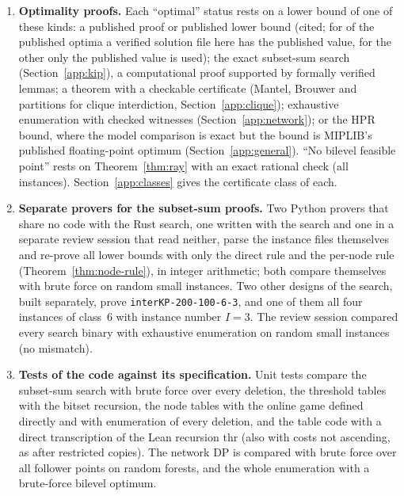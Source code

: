 \begin{enumerate}
\item \textbf{Optimality proofs.} Each ``optimal'' status rests on a lower
bound of one of these kinds: a published proof or published lower bound
(cited; for \NumLitWithFile{} of the \NumLitOptimal{} published optima a verified
solution file here has the published value, for the other \NumLitNoFile{} only
the published value is used); the exact subset-sum search
(Section~\ref{app:kip}), a computational proof supported by formally verified
lemmas; a theorem with a checkable certificate (Mantel, Brouwer and partitions
for clique interdiction, Section~\ref{app:clique}); exhaustive enumeration
with checked witnesses (Section~\ref{app:network}); or the HPR bound, where
the model comparison is exact but the bound is MIPLIB's published
floating-point optimum (Section~\ref{app:general}). ``No bilevel feasible
point'' rests on Theorem~\ref{thm:ray} with an exact rational check
(all \NumRayExact{} instances). Section~\ref{app:classes} gives the certificate
class of each.

\item \textbf{Separate provers for the subset-sum proofs.} Two Python
provers that share no code with the Rust search, one written with the search
and one in a separate review session that read neither, parse the instance files
themselves and re-prove all \NumNewKip{} lower bounds with only the direct rule and the
per-node rule (Theorem~\ref{thm:node-rule}), in integer arithmetic; both
compare themselves with brute force on random small instances. Two other
designs of the search, built separately, prove
\texttt{interKP-200-100-6-3}, and one of them all four instances of class~6
with instance number $I=3$.
The review session compared every search binary with exhaustive enumeration on
\KipBruteForceInstances{} random small instances (no mismatch).

\item \textbf{Tests of the code against its specification.} Unit tests
compare the subset-sum search with brute force over every deletion, the
threshold tables with the bitset recursion, the node tables with the online
game defined directly and with enumeration of every deletion, and the
table code with a direct transcription of the Lean recursion
$\mathrm{thr}$ (also with costs not ascending, as after restricted copies).
The network DP is compared with brute force over all follower points on
random forests, and the whole enumeration with a brute-force bilevel
optimum.


\end{enumerate}
